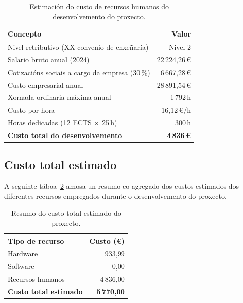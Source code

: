 \begin{table}[htbp]
  \centering
  \begin{tabular}{l|r}
  \rowcolor{udcpink!25}
  \textbf{Concepto} & \textbf{Valor} \\\hline
  Nivel retributivo (XX convenio de enxeñaría)      & Nivel 2 \\
  Salario bruto anual (2024)                        & 22\,224,26\,€ \\
  Cotizacións sociais a cargo da empresa (30\,\%)   & 6\,667,28\,€ \\
  Custo empresarial anual                           & 28\,891,54\,€ \\
  Xornada ordinaria máxima anual                    & 1\,792\,h \\
  Custo por hora                                    & 16,12\,€/h \\
  Horas dedicadas (12 ECTS $\times$ 25\,h)          & 300\,h \\\hline
  \rowcolor{udcpink!25}
  \textbf{Custo total do desenvolvemento}           & \textbf{4\,836\,€} \\
  \end{tabular}
  \caption{Estimación do custo de recursos humanos do desenvolvemento do proxecto.}
  \label{tab:custos-rrhh}
\end{table}

\subsection{Custo total estimado}
A seguinte táboa~\ref{tab:custo-total} amosa un resumo co agregado dos custos estimados dos 
diferentes recursos empregados durante o desenvolvemento do proxecto.

\begin{table}[htbp]
  \centering
  \begin{tabular}{l|r}
  \rowcolor{udcpink!25}
  \textbf{Tipo de recurso} & \textbf{Custo (€)} \\\hline
  Hardware & 933,99 \\
  Software & 0,00 \\
  Recursos humanos & 4\,836,00 \\\hline
  \rowcolor{udcpink!25}
  \textbf{Custo total estimado} & \textbf{5\,770,00} \\
  \end{tabular}
  \caption{Resumo do custo total estimado do proxecto.}
  \label{tab:custo-total}
\end{table}
